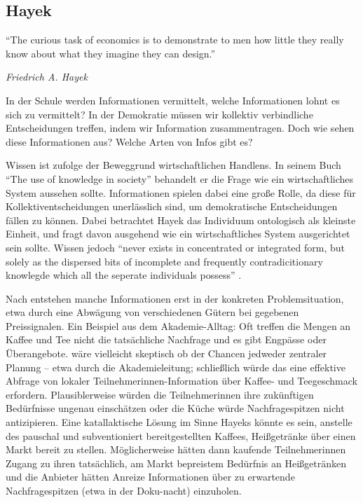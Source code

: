 \subsection{Hayek}

\epigraph{
		``The curious task of economics is to demonstrate to men how little they really know about what they imagine they can design.''}
	{
		\emph{Friedrich A. Hayek
	}

In der Schule werden Informationen vermittelt, welche Informationen lohnt es sich zu vermittelt?
In der Demokratie müssen wir kollektiv verbindliche Entscheidungen treffen, indem wir Information zusammentragen.
Doch wie sehen diese Informationen aus? Welche Arten von Infos gibt es?

Wissen ist \citeauthor{hayek-1945} zufolge der Beweggrund wirtschaftlichen Handlens.
In seinem Buch ``The use of knowledge in society'' behandelt er die Frage wie ein wirtschaftliches System aussehen sollte.
Informationen spielen dabei eine große Rolle, da diese für Kollektiventscheidungen unerlässlich sind, um demokratische Entscheidungen fällen zu können.
Dabei betrachtet Hayek das Individuum ontologisch als kleinste Einheit, und fragt davon ausgehend wie ein wirtschaftliches System ausgerichtet sein sollte.
Wissen jedoch ``never exists in concentrated or integrated form, but solely as the dispersed bits of incomplete and frequently contradicitionary knowlegde which all the seperate individuals possess'' \parencite[520]{hayek-1945}.

Nach \citeauthor{hayek-1945} entstehen manche Informationen erst in der konkreten Problemsituation, etwa durch eine Abwägung von verschiedenen Gütern bei gegebenen Preissignalen.
Ein Beispiel aus dem Akademie-Alltag: Oft treffen die Mengen an Kaffee und Tee nicht die tatsächliche Nachfrage und es gibt Engpässe oder Überangebote.
\citeauthor{hayek-1945} wäre vielleicht skeptisch ob der Chancen jedweder zentraler Planung – etwa durch die Akademieleitung; schließlich würde das eine effektive Abfrage von lokaler Teilnehmerinnen-Information über Kaffee- und Teegeschmack erfordern.
Plausiblerweise würden die Teilnehmerinnen ihre zukünftigen Bedürfnisse ungenau einschätzen oder die Küche würde Nachfragespitzen nicht antizipieren.
Eine katallaktische Lösung im Sinne Hayeks könnte es sein, anstelle des pauschal und subventioniert bereitgestellten Kaffees, Heißgetränke über einen Markt bereit zu stellen.
Möglicherweise hätten dann kaufende Teilnehmerinnen Zugang zu ihren tatsächlich, am Markt bepreistem Bedürfnis an Heißgetränken und die Anbieter hätten Anreize Informationen über zu erwartende Nachfragespitzen (etwa in der Doku-nacht) einzuholen.

}
